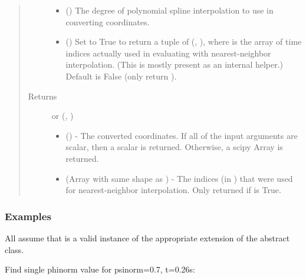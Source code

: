 \documentclass[letterpaper,10pt,english]{sphinxmanual}
\begin{document}
\begin{fulllineitems}
\begin{fulllineitems}
\begin{quote}
\begin{description}
\begin{itemize}
\item {} 
 () \textendash{} The degree of polynomial spline interpolation to
use in converting coordinates.

\item {} 
 () \textendash{} Set to True to return a tuple of (,
), where  is the array of time indices
actually used in evaluating  with nearest-neighbor
interpolation. (This is mostly present as an internal helper.)
Default is False (only return ).

\end{itemize}

\item[{Returns}] \leavevmode

 or (, )
\begin{itemize}
\item {} 
 () - The converted coordinates. If
all of the input arguments are scalar, then a scalar is returned.
Otherwise, a scipy Array is returned.

\item {} 
 (Array with same shape as ) - The indices
(in ) that were used for
nearest-neighbor interpolation. Only returned if  is
True.

\end{itemize}


\end{description}\end{quote}
\subsubsection*{Examples}

All assume that  is a valid instance of the appropriate
extension of the {\hyperref[\detokenize{eqtools:eqtools.core.Equilibrium}]{}} abstract class.

Find single phinorm value for psinorm=0.7, t=0.26s:


\end{fulllineitems}
\end{fulllineitems}
\end{document}
